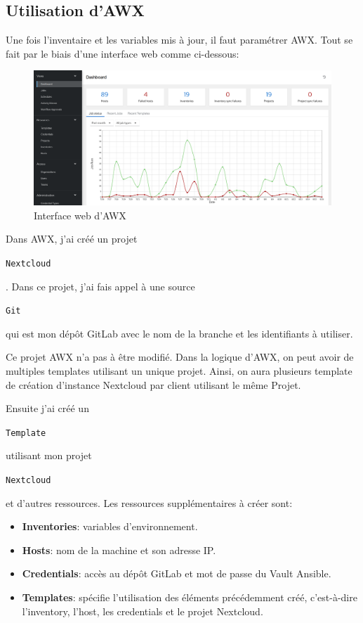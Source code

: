 \documentclass[12pt]{article}
\begin{document}
\subsection{Utilisation d'AWX}
Une fois l'inventaire et les variables mis à jour, il faut paramétrer AWX. 
Tout se fait par le biais d'une interface web comme ci-dessous:
\begin{figure}[!ht]
    \centering
    \includegraphics[width=\textwidth]{src/interface_awx.png}
    \caption{Interface web d'AWX}
    \label{fig:awx}
\end{figure}

Dans AWX, j'ai créé un projet \begin{code}\texttt{\gls{Nextcloud}}\end{code}. 
Dans ce projet, j'ai fais appel à une source \begin{code}\texttt{Git}\end{code} qui est mon dépôt \gls{GitLab} avec le nom de la branche et les identifiants à utiliser. 

Ce projet AWX n'a pas à être modifié.
Dans la logique d'AWX, on peut avoir de multiples templates utilisant un unique projet.
Ainsi, on aura plusieurs template de création d'instance \gls{Nextcloud} par client utilisant le même Projet.

Ensuite j'ai créé un \begin{code}\texttt{Template}\end{code} utilisant mon projet \begin{code}\texttt{\gls{Nextcloud}}\end{code} et d'autres ressources. 
Les ressources supplémentaires à créer sont:
\begin{itemize}
    \item \textbf{Inventories}: variables d'environnement. 
    \item \textbf{Hosts}: nom de la machine et son adresse \gls{IP}.
    \item \textbf{Credentials}:  accès au dépôt \gls{GitLab} et mot de passe du Vault \gls{Ansible}.
    \item \textbf{Templates}: spécifie l'utilisation des éléments précédemment créé, c'est-à-dire l'inventory, l'host, les credentials et le projet \gls{Nextcloud}.
\end{itemize}
\end{document}

